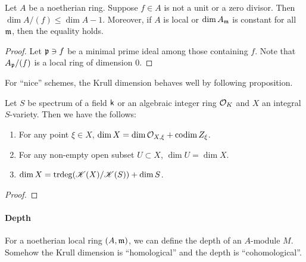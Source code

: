 
    \begin{theorem}
        Let $A$ be a noetherian ring.
        Suppose $f \in A$ is not a unit or a zero divisor.
        Then $\dim A/(f) \leq \dim A - 1$.
        Moreover, if $A$ is local or $\dim A_{\mathfrak{m}}$ is constant for all ${\mathfrak{m}}$, then the equality holds.
    \end{theorem}
    \begin{proof}
        Let ${\mathfrak{p}} \ni f$ be a minimal prime ideal among those containing $f$.
        Note that $A_{\mathfrak{p}}/(f)$ is a local ring of dimension $0$.
    \end{proof}

    For ``nice'' schemes, the Krull dimension behaves well by following proposition.

    \begin{theorem}
        Let $S$ be spectrum of a field ${\mathsf{k}}$ or an algebraic integer ring ${\mathcal{O}}_K$ and $X$ an integral $S$-variety.
        Then we have the follows:
        \begin{enumerate}[label=(\roman*)]
            \item For any point $\xi \in X$, $\dim X = \dim {\mathcal{O}}_{X,\xi} + \operatorname{codim} Z_\xi$.
            \item For any non-empty open subset $U \subset X$, $\dim U = \dim X$.
            \item $\dim X = \operatorname{trdeg}({\mathscr{K}}(X)/{\mathscr{K}}(S)) + \dim S$.
        \end{enumerate}
    \end{theorem}
    \begin{proof}
    \end{proof}

    \begin{example}
        
    \end{example}


    \paragraph{Depth}
    For a noetherian local ring $(A,{\mathfrak{m}})$, we can define the depth of an $A$-module $M$.
    Somehow the Krull dimension is ``homological'' and the depth is ``cohomological''.

